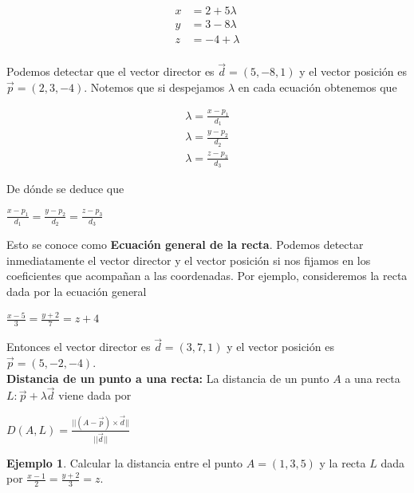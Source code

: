 \documentclass{article}
\theoremstyle{plain}
\theoremstyle{definition}
\newtheorem{ejem}[thm]{Ejemplo}
\begin{document}
\begin{align*}
x&= 2+5\lambda  \\
y&= 3-8\lambda \\
z&= -4+\lambda  \\
\end{align*}


Podemos detectar que el vector director es $\overrightarrow{d}=(5,-8,1)$ y el vector posición es $\overrightarrow{p}=(2,3,-4)$. Notemos que si despejamos $\lambda$ en cada ecuación obtenemos que


\begin{align*}
\displaystyle \lambda = \frac{x-p_1}{d_1}  \\
\lambda = \frac{y-p_2}{d_2} \\
\lambda = \frac{z-p_3}{d_3}
\end{align*}

De dónde se deduce que


\begin{center}
$\displaystyle \frac{x-p_1}{d_1} = \frac{y-p_2}{d_2}  = \frac{z-p_3}{d_3} $
\end{center}

Esto se conoce como \textbf{Ecuación general de la recta}. Podemos detectar inmediatamente el vector director y el vector posición si nos fijamos en los coeficientes que acompañan a las coordenadas. Por ejemplo, consideremos la recta dada por la ecuación general


\begin{center}
$\displaystyle \frac{x-5}{3} = \frac{y+2}{7}  = z+4 $
\end{center}

Entonces el vector director es $\overrightarrow{d}=(3,7,1)$ y el vector posición es $\overrightarrow{p}=(5,-2,-4)$. \\


\textbf{Distancia de un punto a una recta:} La distancia de un punto $A$ a una recta $L: \overrightarrow{p}+ \lambda \overrightarrow{d}$ viene dada por

\begin{center}
$\displaystyle D(A,L) = \frac{|| (A-\overrightarrow{p}) \times \overrightarrow{d}||}{|| \overrightarrow{d}||}$
\end{center}


\begin{ejem}Calcular la distancia entre el punto $A=(1,3,5)$ y la recta $L$ dada por $\displaystyle \frac{x-1}{2} = \frac{y+2}{3}  = z $. \\
\end{ejem}
\end{document}
